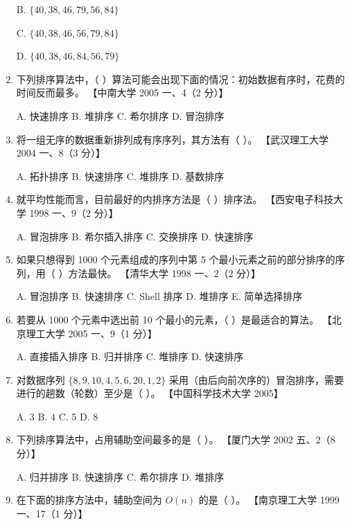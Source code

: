 \documentclass[lang=cn,newtx,10pt,scheme=chinese]{../../elegantbook}
\begin{document}
\begin{enumerate}
    B. $\{40, 38, 46, 79, 56, 84\}$  

    C. $\{40, 38, 46, 56, 79, 84\}$  

    D. $\{40, 38, 46, 84, 56, 79\}$  

    \item 下列排序算法中，（ ）算法可能会出现下面的情况：初始数据有序时，花费的时间反而最多。  
    【中南大学 2005 一、4（2 分）】  

    A. 快速排序 \quad B. 堆排序 \quad C. 希尔排序 \quad D. 冒泡排序  

    \item 将一组无序的数据重新排列成有序序列，其方法有（ ）。  
    【武汉理工大学 2004 一、8（3 分）】  

    A. 拓扑排序 \quad B. 快速排序 \quad C. 堆排序 \quad D. 基数排序  

    \item 就平均性能而言，目前最好的内排序方法是（ ）排序法。  
    【西安电子科技大学 1998 一、9（2 分）】  

    A. 冒泡排序 \quad B. 希尔插入排序 \quad C. 交换排序 \quad D. 快速排序  

    \item 如果只想得到 1000 个元素组成的序列中第 5 个最小元素之前的部分排序的序列，用（ ）方法最快。  
    【清华大学 1998 一、2（2 分）】 

    A. 冒泡排序 \quad B. 快速排序 \quad C. Shell 排序 \quad D. 堆排序 \quad E. 简单选择排序  

    \item 若要从 1000 个元素中选出前 10 个最小的元素，（ ）是最适合的算法。  
    【北京理工大学 2005 一、9（1 分）】 

    A. 直接插入排序 \quad B. 归并排序 \quad C. 堆排序 \quad D. 快速排序  

    \item 对数据序列 $\{8, 9, 10, 4, 5, 6, 20, 1, 2\}$ 采用（由后向前次序的）冒泡排序，需要进行的趟数（轮数）至少是（ ）。  
    【中国科学技术大学 2005】  

    A. 3 \quad B. 4 \quad C. 5 \quad D. 8  

    \item 下列排序算法中，占用辅助空间最多的是（ ）。  
    【厦门大学 2002 五、2（8 分）】  

    A. 归并排序 \quad B. 快速排序 \quad C. 希尔排序 \quad D. 堆排序  

    \item 在下面的排序方法中，辅助空间为 $O(n)$ 的是（ ）。  
    【南京理工大学 1999 一、17（1 分）】 


\end{enumerate}
\end{document}
